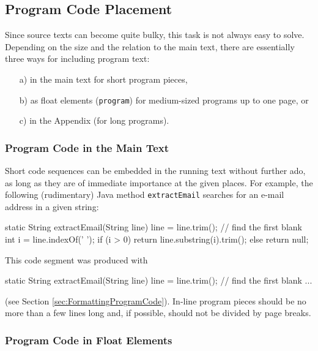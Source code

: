 \subsection{Program Code Placement}

Since source texts can become quite bulky, this task is not always easy to
solve. Depending on the size and the relation to the main text, there are
essentially three ways for including program text:
%
\begin{itemize}
    \item[a)] in the main text for short program pieces,
    \item[b)] as float elements (\texttt{program}) for medium-sized programs
    up to one page, or
    \item[c)] in the Appendix (for long programs).
\end{itemize}


\subsubsection{Program Code in the Main Text}

Short code sequences can be embedded in the running text without further ado,
as long as they are of immediate importance at the given places.
For example, the following (rudimentary) Java method \texttt{extractEmail}
searches for an e-mail address in a given string:
%
\begin{JavaCode}[numbers=none]
static String extractEmail(String line) {
    line = line.trim(); // find the first blank
    int i = line.indexOf(' ');
    if (i > 0)
    return line.substring(i).trim();
    else
    return null;
}
\end{JavaCode}
%
\noindent
This code segment was produced with
%
\begin{LaTeXCode}[numbers=none]
\begin{JavaCode}[numbers=none]
static String extractEmail(String line) {
    line = line.trim(); // find the first blank
    ...
}
\end{JavaCode}
\end{LaTeXCode}
%
(see Section \ref{sec:FormattingProgramCode}). In-line program pieces should be
no more than a few lines long and, if possible, should not be divided by page
breaks.


\subsubsection{Program Code in Float Elements}

